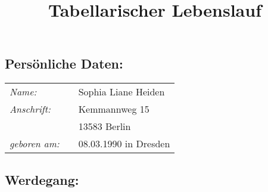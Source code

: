 \documentclass[11pt,DIV=13,a4paper,headinclude]{scrartcl}
\begin{document}
\title{\Large\vspace{-\baselineskip}Tabellarischer Lebenslauf}
\date{}

\maketitle

\thispagestyle{empty}

\vspace{-5\baselineskip}

\subsection*{Pers\"{o}nliche Daten:}


\begin{table}[h!]
\begin{tabular}{lll}
  \textit{Name:}           & \hspace{1cm}  &       Sophia Liane Heiden                     \\
  \textit{Anschrift:}      & \hspace{1cm}  &       Kemmannweg 15                           \\
                        & \hspace{1cm}  &       13583 Berlin                            \\
  \textit{geboren am:}     & \hspace{1cm}  &       08.03.1990 in Dresden                   \\
  \end{tabular}
\end{table}     


\subsection*{Werdegang:}
\end{document}
